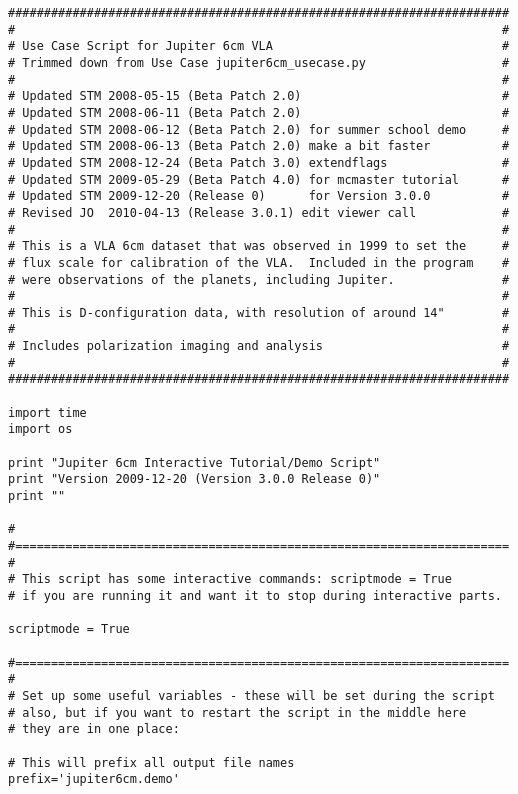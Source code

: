 \small
\begin{verbatim}
######################################################################
#                                                                    #
# Use Case Script for Jupiter 6cm VLA                                #
# Trimmed down from Use Case jupiter6cm_usecase.py                   #
#                                                                    #
# Updated STM 2008-05-15 (Beta Patch 2.0)                            #
# Updated STM 2008-06-11 (Beta Patch 2.0)                            #
# Updated STM 2008-06-12 (Beta Patch 2.0) for summer school demo     #
# Updated STM 2008-06-13 (Beta Patch 2.0) make a bit faster          #
# Updated STM 2008-12-24 (Beta Patch 3.0) extendflags                #
# Updated STM 2009-05-29 (Beta Patch 4.0) for mcmaster tutorial      #
# Updated STM 2009-12-20 (Release 0)      for Version 3.0.0          #
# Revised JO  2010-04-13 (Release 3.0.1) edit viewer call            #
#                                                                    #
# This is a VLA 6cm dataset that was observed in 1999 to set the     #
# flux scale for calibration of the VLA.  Included in the program    #
# were observations of the planets, including Jupiter.               #
#                                                                    #
# This is D-configuration data, with resolution of around 14"        #
#                                                                    #
# Includes polarization imaging and analysis                         #
#                                                                    #
######################################################################

import time
import os

print "Jupiter 6cm Interactive Tutorial/Demo Script"
print "Version 2009-12-20 (Version 3.0.0 Release 0)"
print ""

# 
#=====================================================================
#
# This script has some interactive commands: scriptmode = True
# if you are running it and want it to stop during interactive parts.

scriptmode = True

#=====================================================================
#
# Set up some useful variables - these will be set during the script
# also, but if you want to restart the script in the middle here
# they are in one place:

# This will prefix all output file names
prefix='jupiter6cm.demo'


\end{verbatim}
